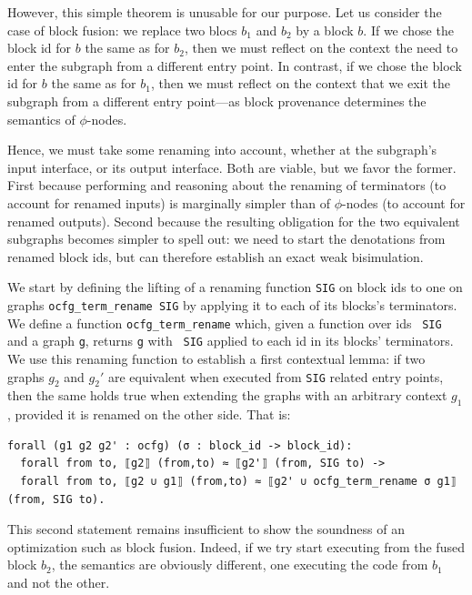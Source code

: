 \documentclass[11pt]{article}
\newcommand{\inlinecoq}[1]{\mbox{\lstinline[style=customcoq,columns=fixed,basewidth=.48em]{#1}}}
\newcommand{\ilc}[1]{\inlinecoq{#1}}
\begin{document}
However, this simple theorem is unusable for our purpose. Let us consider the case of block fusion: we replace two blocs $b_1$ and $b_2$ by a block $b$.
If we chose the block id for $b$ the same as for $b_2$, then we must reflect on the context the need to enter the subgraph from a different entry point.
In contrast, if we chose the block id for $b$ the same as for $b_1$, then we must reflect on the context that we exit the subgraph from a different entry point---as block provenance determines the semantics of $\phi$-nodes.

Hence, we must take some renaming into account, whether at the subgraph's input interface, or its output interface. Both are viable, but we favor the former. First because performing and reasoning about the renaming of terminators (to account for renamed inputs) is marginally simpler than of $\phi$-nodes (to account for renamed outputs). Second because the resulting obligation for the two equivalent subgraphs becomes simpler to spell out: we need to start the denotations from renamed block ids, but can therefore establish an exact weak bisimulation.

We start by defining the lifting of a renaming function \ilc{SIG} on block ids to one on graphs \ilc{ocfg_term_rename SIG} by applying it to each of its blocks's terminators.
We define a function \ilc{ocfg_term_rename} which, given a function over ids~ \ilc{SIG} and a graph \ilc{g}, returns \ilc{g} with~ \ilc{SIG} applied to each id in its blocks' terminators.
We use this renaming function to establish a first contextual lemma: if two graphs $g_2$ and $g_2'$ are equivalent when executed from \ilc{SIG} related entry points, then the same holds true when extending the graphs with an arbitrary context $g_1$, provided it is renamed on the other side. That is:
  \begin{lstlisting}[style=customcoq,basicstyle=\small\ttfamily]
forall (g1 g2 g2' : ocfg) (σ : block_id -> block_id):
  forall from to, ⟦g2⟧ (from,to) ≈ ⟦g2'⟧ (from, SIG to) ->
  forall from to, ⟦g2 ∪ g1⟧ (from,to) ≈ ⟦g2' ∪ ocfg_term_rename σ g1⟧ (from, SIG to).
  \end{lstlisting}

This second statement remains insufficient to show the soundness of an optimization such as block fusion. Indeed, if we try start executing from the fused block $b_2$, the semantics are obviously different, one executing the code from $b_1$ and not the other.
\end{document}
